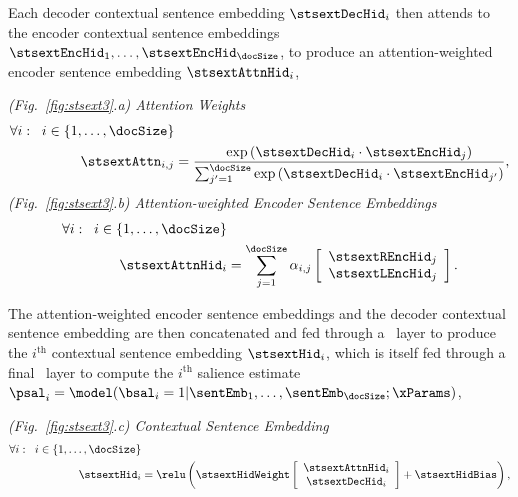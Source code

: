 \FloatBarrier


Each decoder contextual sentence embedding $\stsextDecHid_i$ then attends
to the encoder contextual sentence embeddings $\stsextEncHid_1,\ldots,
\stsextEncHid_\docSize$, to produce an attention-weighted encoder sentence
embedding $\stsextAttnHid_i$,
    
\vspace{10pt} \noindent \textit{(Fig.~\ref{fig:stsext3}.a) Attention Weights}
\begin{align}
    \forall i : \;\; i \in \{1,\ldots,\docSize\}&\nonumber \\
    \stsextAttn_{i,j} & = 
        \frac{\exp \left(\stsextDecHid_i \cdot  \stsextEncHid_j \right)}{
            \sum_{j^\prime=1}^{\docSize}\exp\left(  
                \stsextDecHid_i \cdot  \stsextEncHid_{j^\prime} \right)},
\end{align}
\vspace{10pt} \noindent \textit{(Fig.~\ref{fig:stsext3}.b) Attention-weighted Encoder Sentence Embeddings} 
\begin{align}
    \forall i : \;\; i \in \{1,\ldots,\docSize\}& \nonumber \\
    \stsextAttnHid_i & = 
        \sum_{j=1}^{\docSize} \alpha_{i,j} \left[\begin{array}{c}
            \stsextREncHid_j\\ 
            \stsextLEncHid_j\end{array}\right].
\end{align}

The attention-weighted encoder sentence embeddings and the decoder 
contextual sentence embedding are then concatenated and fed through a 
\feedforward~layer to produce the $i^\textrm{th}$ contextual sentence
embedding $\stsextHid_i$, which is itself fed through a final 
\feedforward~layer to compute the $i^\textrm{th}$ salience estimate
$\psal_i = \model(\bsal_i=1|\sentEmb_1,\ldots,\sentEmb_\docSize;\xParams)$,

\vspace{10pt}   \noindent \textit{(Fig.~\ref{fig:stsext3}.c) Contextual Sentence Embedding} 
\begin{align}
    \forall i : \;\; i \in \{1,\ldots,\docSize\} & \nonumber\\
    \stsextHid_i &= \relu\left(\stsextHidWeight \left[\begin{array}{c}
        \stsextAttnHid_i \\ 
        \stsextDecHid_i \end{array}\right] 
        + \stsextHidBias \right),
\end{align}

